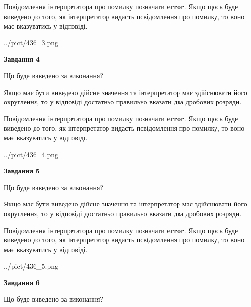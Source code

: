 \documentclass[12pt, ukrainian]{article}
\begin{document}
{\begin {Large}
Повідомлення інтерпретатора про помилку позначати \textbf{error}.
Якщо щось буде виведено до того, як інтерпретатор видасть повідомлення про помилку, 
то воно має вказуватись у відповіді. \par

\begin{center}
	{../pict/436_3.png}
\end{center}
\newpage

{\begin {center}\textbf{Завдання 4}\end {center}}\par
Що буде виведено за виконання? \par

Якщо має бути виведено дійсне значення та інтерпретатор має здійснювати його округлення, 
то у відповіді достатньо правильно вказати два дробових розряди.

Повідомлення інтерпретатора про помилку позначати \textbf{error}.
Якщо щось буде виведено до того, як інтерпретатор видасть повідомлення про помилку, 
то воно має вказуватись у відповіді. \par

\begin{center}
	{../pict/436_4.png}
\end{center}
\newpage

{\begin {center}\textbf{Завдання 5}\end {center}}\par
Що буде виведено за виконання? \par

Якщо має бути виведено дійсне значення та інтерпретатор має здійснювати його округлення, 
то у відповіді достатньо правильно вказати два дробових розряди.

Повідомлення інтерпретатора про помилку позначати \textbf{error}.
Якщо щось буде виведено до того, як інтерпретатор видасть повідомлення про помилку, 
то воно має вказуватись у відповіді. \par

\begin{center}
	{../pict/436_5.png}
\end{center}
\newpage

{\begin {center}\textbf{Завдання 6}\end {center}}\par
Що буде виведено за виконання? \par


\end{Large}}
\end{document}

